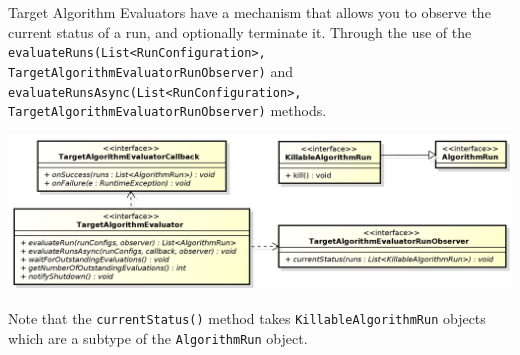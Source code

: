 \documentclass[11pt,letterpaper,oneside]{article}
\begin{document}
Target Algorithm Evaluators have a mechanism that allows you to observe the current status of a run, and optionally terminate it. Through the use of the \texttt{evaluateRuns(List<RunConfiguration>, TargetAlgorithmEvaluatorRunObserver)} and \texttt{evaluateRunsAsync(List<RunConfiguration>, TargetAlgorithmEvaluatorRunObserver)} methods.


\begin{center}
\includegraphics[scale=0.5]{img/UML/TAEObserver.png}
\end{center}


Note that the \texttt{currentStatus()} method takes \texttt{KillableAlgorithmRun} objects which are a subtype of the \texttt{AlgorithmRun} object.
\end{document}
